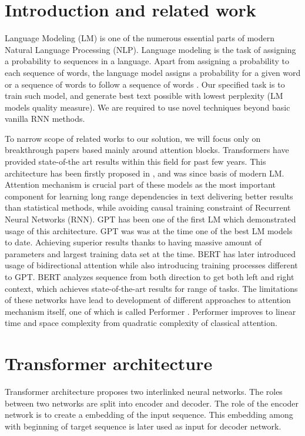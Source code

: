 



\section{Introduction and related work}
Language Modeling (LM) is one of the numerous essential parts of modern Natural Language Processing (NLP). Language modeling is the task of assigning a probability to sequences in a language. Apart from assigning a probability to each sequence of words, the language model assigns a probability for a given word or a sequence of words to follow a sequence of words \cite{Goldberg2017}. Our specified task is to train such model, and generate best text possible with lowest perplexity (LM models quality measure). We are required to use novel techniques beyond basic vanilla RNN methods. 

To narrow scope of related works to our solution, we will focus only on breakthrough papers based mainly around attention blocks. Transformers have provided state-of-the art results within this field for past few years. This architecture has been firstly proposed in  \cite{DBLP:attention}, and was since basis of modern LM. Attention mechanism is crucial part of these models as the most important component for learning long range dependencies in text delivering better results than statistical methods, while avoiding causal training constraint of Recurrent Neural Networks (RNN). GPT \cite{radford2018improving:gpt} has been one of the first LM which demonstrated usage of this architecture. GPT was was at the time one of the best LM models to date. Achieving superior results thanks to having massive amount of parameters and largest training data set at the time. BERT \cite{DBLP:bert} has later introduced usage of bidirectional attention while also introducing training processes different to GPT. BERT analyzes sequence from both direction to get both left and right context, which achieves state-of-the-art results for range of tasks. The limitations of these networks have lead to development of different approaches to attention mechanism itself, one of which is called Performer \cite{DBLP:performer}. Performer improves to linear time and space complexity from quadratic complexity of classical attention.

\section{Transformer architecture}
Transformer architecture proposes two interlinked neural networks. The roles between two networks are split into encoder and decoder. The role of the encoder network is to create a embedding of the input sequence. This embedding among with beginning of target sequence is later used as input for decoder network. 

